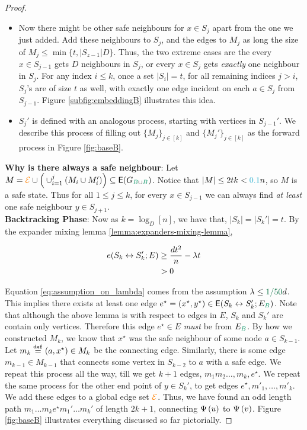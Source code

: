 \documentclass[11pt]{article}
\begin{document}
\begin{proof}
\begin{itemize}
\item{Now there might be other safe neighbours for $x \in S_j$ apart from the one we just added. Add these neighbours to $S_j$, and the edges to $M_j$ as long the size of $M_j \leq \min\{t, |S_{z-1}|D\}$.
    Thus, the two extreme cases are the every $x \in S_{j-1}$ gets $D$ neighbours in $S_j$, or every $x \in S_{j}$ gets \emph{exactly} one neighbour in $S_j$.
For any index $i \leq k$, once a set $|S_i|=t$, for all remaining indices $j > i$, $S_j$'s are of size $t$ as well, with exactly one edge incident on each $a \in S_j$ from $S_{j-1}$. Figure \ref{subfig:embeddingB} illustrates this idea.
  }

\item{$S_{j}'$ is defined with an analogous process, starting with vertices in $S_{j-1}'$. We describe this process of filling out $\{ M_j \}_{j \in [k]}$ and $\{M_j' \}_{j \in [k]}$ as the forward process in Figure \ref{fig:baseB}.}
  

\end{itemize}

\textbf{Why is there always a safe neighbour}: Let $M = \GlobalEdgeSet \cup \Big(\cup_{i=1}^{j} (M_i \cup M'_i)\Big) \subseteq \Edges{\BipartiteG}$.
Notice that  $|M| \leq 2tk < \epsilonA n$, so $M$ is a safe state.
Thus for all $1 \leq j \leq k$, for every $x \in S_{j-1}$ we can always find \emph{at least} one safe neighbour $y \in S_{j+1}$. \\

\textbf{Backtracking Phase}: Now as $k = \log_D[n]$, we have that, $|S_k| = |S_k'|= t$.
By the expander mixing lemma \ref{lemma:expanders-mixing-lemma},

\begin{align}
e(S_k \leftrightarrow S_k'; E)
 &\geq \frac{d t^2}{n} - \lambda t \\
	&> 0 \label{eq:assumption_on_lambda}
\end{align}

Equation \eqref{eq:assumption_on_lambda} comes from the assumption $\lambda \leq \epsilonL d$.
This implies there exists at least one edge $e^\star=(x^\star,y^\star) \in \CutEdgesSet{S_k}{S_k'}{E_{\GreenB}}$.
Note that although the above lemma is with respect to edges in $E$, $S_k$ and $S_k'$ are contain only  vertices.
Therefore this edge $e^\star \in E$ \emph{must} be from $E_{\GreenB}$.
By how we constructed $M_k$, we know that $x^\star$ was the safe neighbour of some node $a \in S_{k-1}$.
Let $m_k \text{}\overset{\mathtt{def}}{=} (a,x^\star) \in M_k$ be the connecting edge.
Similarly, there is some edge $m_{k-1} \in M_{k-1}$ that connects some vertex in $S_{k-2}$ to $a$ with a safe edge.
We repeat this process all the way, till we get $k+1$ edges, $m_1 m_2 \dots, m_k, e^\star$.
We repeat the same process for the other end point of $y \in S_k'$, to get edges $e^\star, m'_1, \dots, m'_k$.
We add these edges to a global edge set $\textcolor{orange}{\mathcal{E}}$.
Thus, we have found an odd length path $m_1\dots m_k e^\star m_1'\dots m_k'$ of length $2k+1$, connecting $\Psi\left(u\right)$ to $\Psi\left(v\right)$.
 Figure \ref{fig:baseB} illustrates everything discussed so far pictorially.


\end{proof}
\end{document}
